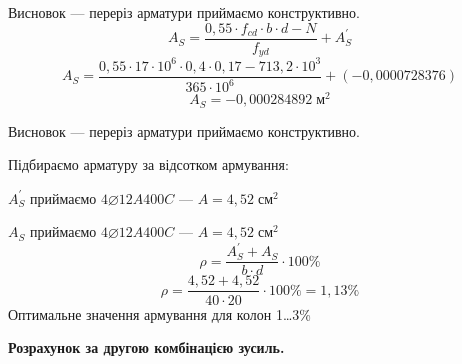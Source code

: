 \documentclass[a4paper,14pt]{article}
\begin{document}
\begin{enumerate}
        Висновок --- переріз арматури приймаємо конструктивно.
        \begin{equation}
            A_S = \dfrac{0,55 \cdot f_{cd} \cdot b \cdot d - N}{f_{yd}} + A_S^\prime
        \end{equation}
        $$A_S = \dfrac{0,55 \cdot 17 \cdot 10^6 \cdot 0,4 \cdot 0,17 - 713,2 \cdot 10^3}{365 \cdot 10^6} +(-0,0000728376)$$
        $$A_S = -0,000284892\;\textit{м}^2$$

        Висновок --- переріз арматури приймаємо конструктивно.

        Підбираємо арматуру за відсотком армування:

        $A_S^\prime$ приймаємо $4\varnothing12A400C$ --- $A = 4,52\;\textit{см}^2$

        $A_S$ приймаємо $4\varnothing12A400C$ --- $A = 4,52\;\textit{см}^2$
        \begin{equation}
            \rho = \dfrac{A_S^\prime + A_S}{b \cdot d} \cdot 100\%
        \end{equation}
        $$\rho = \dfrac{4,52 + 4,52}{40 \cdot 20} \cdot 100\% = 1,13\%$$
        Оптимальне значення армування для колон 1\ldots 3\%    
\end{enumerate}
\textbf{Розрахунок за другою комбінацією зусиль.}
\end{document}
